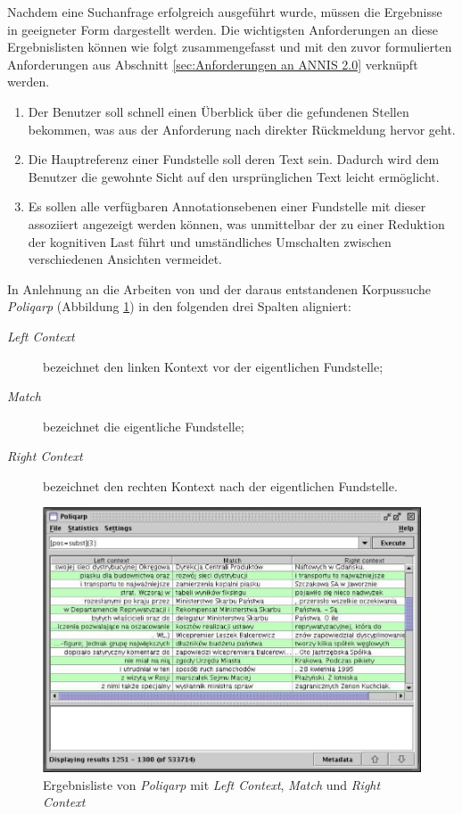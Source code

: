 Nachdem eine Suchanfrage erfolgreich ausgeführt wurde, müssen die Ergebnisse in geeigneter Form dargestellt werden. Die wichtigsten Anforderungen an diese Ergebnislisten können wie folgt zusammengefasst und mit den zuvor formulierten Anforderungen aus Abschnitt \ref{sec:Anforderungen an ANNIS 2.0} verknüpft werden.

\begin{enumerate}
	\item{Der Benutzer soll schnell einen Überblick über die gefundenen Stellen bekommen, was aus der Anforderung nach direkter Rückmeldung hervor geht.}
	\item{Die Hauptreferenz einer Fundstelle soll deren Text sein. Dadurch wird dem Benutzer die gewohnte Sicht auf den ursprünglichen Text leicht ermöglicht.}
	\item{Es sollen alle verfügbaren Annotationsebenen einer Fundstelle mit dieser assoziiert angezeigt werden können, was unmittelbar der zu einer Reduktion der kognitiven Last führt und umständliches Umschalten zwischen verschiedenen Ansichten vermeidet.}
\end{enumerate}

\newpage
In Anlehnung an die Arbeiten von \cite{prze2004ipipan} und der daraus entstandenen Korpussuche \emph{Poliqarp} (Abbildung \ref{fig:ErgebnislistePoliqarp}) in den folgenden drei Spalten aligniert:

\begin{description}
	\item[\emph{Left Context}]{bezeichnet den linken Kontext vor der eigentlichen Fundstelle;}
	\item[\emph{Match}]{bezeichnet die eigentliche Fundstelle;}
	\item[\emph{Right Context}]{bezeichnet den rechten Kontext nach der eigentlichen Fundstelle.}
\end{description}

\begin{figure}[H]
	\centering
	\includegraphics*[width=1.0\textwidth]{figures/DA/Poliqarp_3.jpg}
	\caption{Ergebnisliste von \emph{Poliqarp} mit \emph{Left Context}, \emph{Match} und \emph{Right Context}\citep[vgl.][]{prze2004ipipan}}\label{fig:ErgebnislistePoliqarp}
\end{figure}

